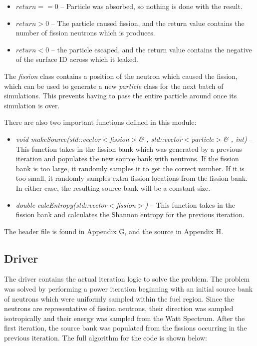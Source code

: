 \begin{itemize}
\item $return == 0$ -- Particle was absorbed, so nothing is done with the result.
\item $return > 0$ -- The particle caused fission, and the return value contains the number of fission neutrons which is produces.
\item $return < 0$ -- the particle escaped, and the return value contains the negative of the surface ID across which it leaked.
\end{itemize}

The \textit{fission} class contains a position of the neutron which caused the fission, which can be used to generate a new \textit{particle} class for the next batch of simulations.  This prevents having to pass the entire particle around once its simulation is over.

There are also two important functions defined in this module:

\begin{itemize}
\item \textit{void makeSource(std::vector$<$fission$>$\& , std::vector$<$particle$>$\& , int)} -- This function takes in the fission bank which was generated by a previous iteration and populates the new source bank with neutrons.  If the fission bank is too large, it randomly samples it to get the correct number.  If it is too small, it randomly samples extra fission locations from the fission bank.  In either case, the resulting source bank will be a constant size.
\item \textit{double calcEntropy(std::vector$<$fission$>$)} -- This function takes in the fission bank and calculates the Shannon entropy for the previous iteration.
\end{itemize}

The header file is found in Appendix G, and the source in Appendix H.

\subsection{Driver}\label{ss:driver}

The driver contains the actual iteration logic to solve the problem.  The problem was solved by performing a power iteration beginning with an initial source bank of neutrons which were uniformly sampled within the fuel region.  Since the neutrons are representative of fission neutrons, their direction was sampled isotropically and their energy was sampled from the Watt Spectrum.  After the first iteration, the source bank was populated from the fissions occurring in the previous iteration.  The full algorithm for the code is shown below:

